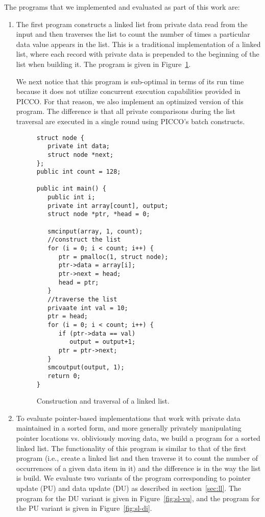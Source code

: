 \documentclass[11pt]{article}
\begin{document}
The programs that we implemented and evaluated as part of this work are: 
\begin{enumerate}
\item The first program constructs a linked list from private data read
  from the input and then traverses the list to count the number of times a
  particular data value appears in the list. This is a traditional
  implementation of a linked list, where each record with private data is
  prepended to the beginning of the list when building it. The program is
  given in Figure~\ref{fig:ul}. 
  
  We next notice that this program is sub-optimal in terms of its run time
  because it does not utilize concurrent execution capabilities provided in
  PICCO. For that reason, we also implement an optimized version of this
  program. The difference is that all private comparisons during the list
  traversal are executed in a single round using PICCO's batch constructs.

\begin{figure}[t!]\small
\begin{verbatim}
struct node {
   private int data;
   struct node *next;
};
public int count = 128;

public int main() {
   public int i;
   private int array[count], output;
   struct node *ptr, *head = 0;

   smcinput(array, 1, count);
   //construct the list 
   for (i = 0; i < count; i++) {
      ptr = pmalloc(1, struct node);
      ptr->data = array[i];
      ptr->next = head;
      head = ptr;
   }
   //traverse the list
   privaate int val = 10;
   ptr = head;
   for (i = 0; i < count; i++) {
      if (ptr->data == val)
         output = output+1;
      ptr = ptr->next;
   }
   smcoutput(output, 1); 
   return 0;
}\end{verbatim}
\caption{Construction and traversal of a linked list.} \label{fig:ul}
\end{figure} 


\item To evaluate pointer-based implementations that work with private data
  maintained in a sorted form, and more generally privately manipulating
  pointer locations vs. obliviously moving data, we build a program for a
  sorted linked list. The functionality of this program is similar to that
  of the first program (i.e., create a linked list and then traverse it to
  count the number of occurrences of a given data item in it) and the
  difference is in the way the list is build. We evaluate two variants of
  the program corresponding to pointer update (PU) and data update (DU) as
  described in section~\ref{sec:ll}. The program for the DU variant is given
  in Figure~\ref{fig:sl-vu}, and the program for the PU variant is given in
  Figure~\ref{fig:sl-di}. 
  

\end{enumerate}
\end{document}
